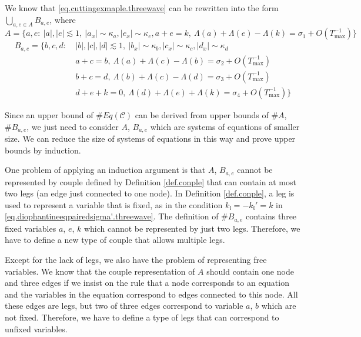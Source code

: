 We know that \eqref{eq.cuttingexmaple.threewave} can be rewritten into the form $\bigcup_{a,e\in A} B_{a,e}$, where
\begin{equation}\label{eq.couplequationA.threewave}
    A=\{a, e:\ |a|,|e|\lesssim 1,\ |a_x|\sim \kappa_{a},|e_x|\sim \kappa_{e}, a+e=k,\ \Lambda(a) + \Lambda(e) - \Lambda(k) =\sigma_{1} + O(T^{-1}_{\text{max}})\}
\end{equation}
\begin{equation}\label{eq.couplequationB.threewave}
    \begin{split}
        B_{a,e}=\{b, c, d:\ &|b|,|c|,|d|\lesssim 1,\ |b_x|\sim \kappa_{b},|c_x|\sim \kappa_{c},|d_x|\sim \kappa_{d}
        \\
        &a+c=b,\ \Lambda(a) + \Lambda(c) - \Lambda(b) =\sigma_{2} + O(T^{-1}_{\text{max}})
        \\
        &b+c=d,\ \Lambda(b) + \Lambda(c) - \Lambda(d) =\sigma_{3} + O(T^{-1}_{\text{max}})
        \\
        &d+e+k=0,\ \Lambda(d) + \Lambda(e) + \Lambda(k) =\sigma_{4} + O(T^{-1}_{\text{max}})\}
    \end{split}    
\end{equation}

Since an upper bound of $\# Eq(\mathcal{C})$ can be derived from upper bounds of $\# A$, $\# B_{a,e}$, we just need to consider $A$, $B_{a,e}$ which are systems of equations of smaller size. We can reduce the size of systems of equations in this way and prove upper bounds by induction.

One problem of applying an induction argument is that $A$, $B_{a,e}$ cannot be represented by couple defined by Definition \ref{def.conple} that can contain at most two legs (an edge just connected to one node). In Definition \ref{def.conple}, a leg is used to represent a variable that is fixed, as in the condition $k_{\mathfrak{l}} = - k_{\mathfrak{l}}'= k$ in \eqref{eq.diophantineeqpairedsigma'.threewave}. The definition of $\# B_{a,e}$ contains three fixed variables $a$, $e$, $k$ which cannot be represented by just two legs. Therefore, we have to define a new type of couple that allows multiple legs.

Except for the lack of legs, we also have the problem of representing free variables. We know that the couple representation of $A$ should contain one node and three edges if we insist on the rule that a node corresponds to an equation and the variables in the equation correspond to edges connected to this node. All these edges are legs, but two of three edges correspond to variable $a$, $b$ which are not fixed. Therefore, we have to define a type of legs that can correspond to unfixed variables.

